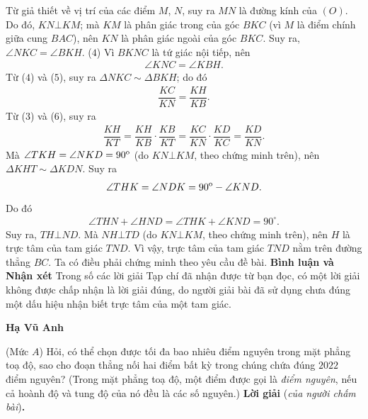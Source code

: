 \begin{multicols}{2}
	\vskip 0.05cm
	Từ giả thiết về vị trí của các điểm $M$, $N$, suy ra $MN$ là đường kính của $(O)$. Do đó, $KN \bot KM$; mà $KM$ là phân giác trong của góc $BKC$ (vì $M$ là điểm chính giữa cung $BAC$), nên $KN$ là phân giác ngoài của góc $BKC$. Suy ra, $\angle NKC = \angle BKH$. \hfill ($4$)
	\vskip 0.05cm 
	Vì $BKNC$ là tứ giác nội tiếp, nên 
	\begin{align*}
		\angle KNC = \angle KBH. \tag{$5$}
	\end{align*}
	Từ ($4$) và ($5$), suy ra $\Delta NKC \sim \Delta BKH$; do đó
	\begin{align*}
		\dfrac{{KC}}{{KN}} = \dfrac{{KH}}{{KB}}. \tag{$6$}
	\end{align*}
	Từ ($3$) và ($6$), suy ra
	\begin{align*}
		\dfrac{{KH}}{{KT}} = \dfrac{{KH}}{{KB}} \cdot \dfrac{{KB}}{{KT}} = \dfrac{{KC}}{{KN}} \cdot \dfrac{{KD}}{{KC}} = \dfrac{{KD}}{{KN}}.
	\end{align*}
	Mà  $\angle TKH = \angle NKD = {90^{\rm{o}}}$ (do $KN \bot KM$, theo chứng minh trên), nên $\Delta KHT \sim  \Delta KDN$. Suy ra
	\begin{align*}
		\angle THK = \angle NDK = {90^{\rm{o}}} - \angle KND.
	\end{align*}
	Do đó
	\begin{align*}
		\angle THN + \angle HND = \angle THK + \angle KND = {90^\circ}.
	\end{align*}
	Suy ra, $TH \bot ND$. Mà $NH \bot TD$ (do $KN \bot KM$, theo chứng minh trên), nên $H$ là trực tâm của tam giác $TND$. Vì vậy, trực tâm của tam giác $TND$ nằm trên đường thẳng $BC$.
	\vskip 0.05cm
	Ta có điều phải chứng minh theo yêu cầu đề bài.
	\vskip 0.05cm
	\textbf{\color{thachthuctoanhoc}Bình luận và Nhận xét}
	\vskip 0.05cm
	Trong số các lời giải Tạp chí đã nhận được từ bạn đọc, có một lời giải không được chấp nhận là lời giải đúng, do người giải bài đã sử dụng chưa đúng một dấu hiệu nhận biết trực tâm của một tam giác.
	\begin{flushright}
		\textbf{\color{thachthuctoanhoc}Hạ Vũ Anh}
	\end{flushright}
	{}
	(Mức $A$) Hỏi, có thể chọn được tối đa bao nhiêu điểm nguyên trong mặt phẳng toạ độ, sao cho đoạn thẳng nối hai điểm bất kỳ trong chúng chứa đúng $2022$ điểm nguyên?
	\vskip 0.05cm
	(Trong mặt phẳng toạ độ, một điểm được gọi là {\it điểm nguyên}, nếu cả hoành độ và tung độ của nó đều là các số nguyên.)
	\vskip 0.05cm
	\textbf{\color{thachthuctoanhoc}Lời giải} (\textit{của người chấm bài})\textbf{\color{thachthuctoanhoc}.}

\end{multicols}
